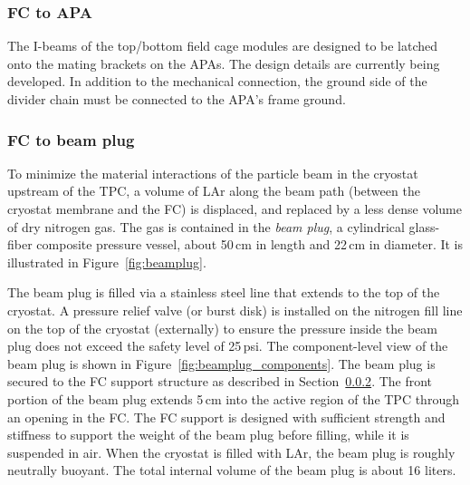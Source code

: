 \subsubsection{FC to APA}

The I-beams of the top/bottom field cage modules are designed to be latched onto the mating brackets on the APAs.  The design details are currently being developed.   
In addition to the mechanical connection, the ground side of the divider chain must be connected to the APA's frame ground. 

\subsubsection{FC to beam plug}
\label{subsec:fc-beamplug}

To minimize the material interactions of the particle beam in the cryostat upstream of the TPC, a volume of LAr along the beam path (between the cryostat membrane and the FC) is displaced, and replaced by a less dense volume of dry nitrogen gas. The gas is contained in the \textit{beam plug}, a cylindrical glass-fiber composite pressure vessel, about 50\,cm in length and 22\,cm in diameter.
It is illustrated in Figure~\ref{fig:beamplug}.

The beam plug is filled via a stainless steel line that extends to the top of the cryostat. 
A pressure relief valve (or burst disk) is installed on the nitrogen fill line on the top of the cryostat (externally) to ensure the pressure inside the beam plug does not exceed the safety level of 25\,psi. The component-level view of the beam plug is shown in Figure~\ref{fig:beamplug_components}.  The beam plug is secured to the FC support structure as described in Section~\ref{subsec:fc-beamplug}. The front portion of the beam plug extends  5\,cm into the active region of the TPC  through an opening in the FC. The FC support is designed with sufficient strength and stiffness to support the weight of the beam plug before filling, while it is suspended in air.  When the cryostat is filled with LAr, the beam plug is roughly neutrally buoyant.  The total internal volume of the beam plug is about 16 liters. 


